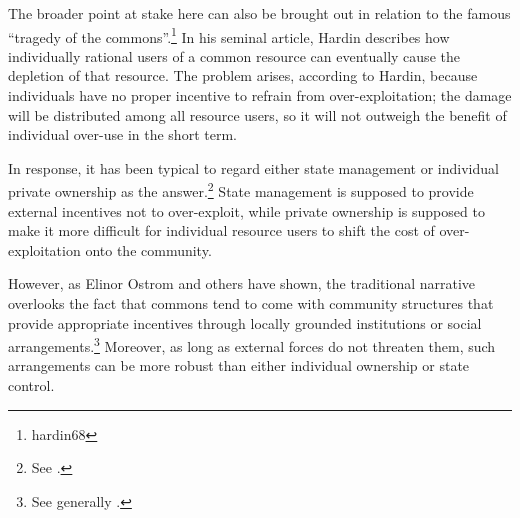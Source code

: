 The broader point at stake here can also be brought out in relation to the famous ``tragedy of the commons''.\footnote{hardin68} In his seminal article, Hardin describes how individually rational users of a common resource can eventually cause the depletion of that resource. The problem arises, according to Hardin, because individuals have no proper incentive to refrain from over-exploitation; the damage will be distributed among all resource users, so it will not outweigh the benefit of individual over-use in the short term.

In response, it has been typical to regard either state management or individual private ownership as the answer.\footnote{See \cite[8-13]{ostrom90}.} State management is supposed to provide external incentives not to over-exploit, while private ownership is supposed to make it more difficult for individual resource users to shift the cost of over-exploitation onto the community.

However, as Elinor Ostrom and others have shown, the traditional narrative overlooks the fact that commons tend to come with community structures that provide appropriate incentives through locally grounded institutions or social arrangements.\footnote{See generally \cite{ostrom90}.} Moreover, as long as external forces do not threaten them, such arrangements can be more robust than either individual ownership or state control.


